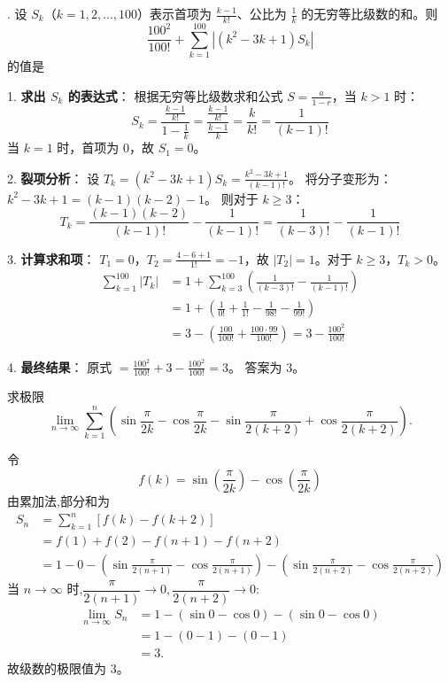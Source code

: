 \begin{questions}
    . 设 \(S_{k}\)（\(k = 1, 2, \dots, 100\)）表示首项为 \(\frac{k - 1}{k!}\)、公比为 \(\frac{1}{k}\) 的无穷等比级数的和。则 \[\frac{100^{2}}{100!} + \sum_{k=1}^{100} \left| \left( k^{2} - 3k + 1 \right) S_{k} \right|\] 的值是

\begin{solution}
1. \textbf{求出 \(S_k\) 的表达式}：
根据无穷等比级数求和公式 \(S = \frac{a}{1 - r}\)，当 \(k > 1\) 时：
\[
S_{k} = \frac{\frac{k - 1}{k!}}{1 - \frac{1}{k}} = \frac{\frac{k - 1}{k!}}{\frac{k - 1}{k}} = \frac{k}{k!} = \frac{1}{(k - 1)!}
\]
当 \(k = 1\) 时，首项为 0，故 \(S_1 = 0\)。

2. \textbf{裂项分析}：
设 \(T_k = (k^{2} - 3k + 1)S_{k} = \frac{k^{2} - 3k + 1}{(k - 1)!}\)。
将分子变形为：\(k^{2} - 3k + 1 = (k-1)(k-2) - 1\)。
则对于 \(k \ge 3\)：
\[
T_k = \frac{(k-1)(k-2)}{(k-1)!} - \frac{1}{(k-1)!} = \frac{1}{(k-3)!} - \frac{1}{(k-1)!}
\]

3. \textbf{计算求和项}：
\(T_1 = 0\)，\(T_2 = \frac{4-6+1}{1!} = -1\)，故 \(|T_2| = 1\)。对于 \(k \ge 3\)，\(T_k > 0\)。
\begin{align*}
\sum_{k=1}^{100} |T_k| &= 1 + \sum_{k=3}^{100} \left( \frac{1}{(k-3)!} - \frac{1}{(k-1)!} \right) \\
&= 1 + \left( \frac{1}{0!} + \frac{1}{1!} - \frac{1}{98!} - \frac{1}{99!} \right) \\
&= 3 - \left( \frac{100}{100!} + \frac{100 \cdot 99}{100!} \right) = 3 - \frac{100^2}{100!}
\end{align*}

4. \textbf{最终结果}：
原式 \(= \frac{100^2}{100!} + 3 - \frac{100^2}{100!} = 3\)。
答案为 3。
\end{solution}

    \question 求极限
    \[
    \lim_{n \to \infty} \sum_{k=1}^{n} \left( \sin  \frac{\pi}{2k} - \cos  \frac{\pi}{2k} - \sin  \frac{\pi}{2(k+2)} + \cos \frac{\pi}{2(k+2)} \right).
    \]
    \begin{solution}
        令 
        \[
        f(k) = \sin \left( \frac{\pi}{2k} \right) - \cos \left( \frac{\pi}{2k} \right)
        \]
        由累加法,部分和为 
        \begin{align*}
        S_n &= \sum_{k=1}^{n} [f(k) - f(k+2)] \\
        &= f(1) + f(2) - f(n+1) - f(n+2) \\
        &= 1-0 - \left( \sin \frac{\pi}{2(n+1)} - \cos \frac{\pi}{2(n+1)} \right) - \left( \sin \frac{\pi}{2(n+2)} - \cos \frac{\pi}{2(n+2)} \right)
        \end{align*}
        当 $n \to \infty$ 时,$\dfrac{\pi}{2(n+1)} \to 0,\dfrac{\pi}{2(n+2)} \to 0$:
        \begin{align*}
        \lim_{n \to \infty} S_n &= 1 - (\sin 0 - \cos 0) - (\sin 0 - \cos 0) \\
        &= 1 - (0 - 1) - (0 - 1) \\
        &= 3.
        \end{align*}
        故级数的极限值为 3。
    \end{solution}


\end{questions}
